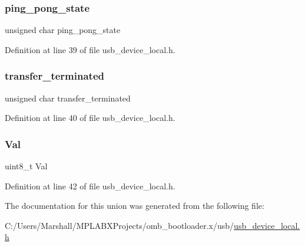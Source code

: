 \mbox{\label{union_e_p___s_t_a_t_u_s_af0b1bd7b5767b174b8f055d94cac4bcc}} 
\subsubsection{\texorpdfstring{ping\_pong\_state}{ping\_pong\_state}}
{\footnotesize\ttfamily unsigned char ping\+\_\+pong\+\_\+state}



Definition at line 39 of file usb\+\_\+device\+\_\+local.\+h.

\mbox{\label{union_e_p___s_t_a_t_u_s_a4a20792b6382277d34763fd0157c9f2e}} 
\subsubsection{\texorpdfstring{transfer\_terminated}{transfer\_terminated}}
{\footnotesize\ttfamily unsigned char transfer\+\_\+terminated}



Definition at line 40 of file usb\+\_\+device\+\_\+local.\+h.

\mbox{\label{union_e_p___s_t_a_t_u_s_aa0c179f4462bb12ca1ed40d18c89cda1}} 
\subsubsection{\texorpdfstring{Val}{Val}}
{\footnotesize\ttfamily uint8\+\_\+t Val}



Definition at line 42 of file usb\+\_\+device\+\_\+local.\+h.



The documentation for this union was generated from the following file\+:\begin{DoxyCompactItemize}
\item 
C\+:/\+Users/\+Marshall/\+M\+P\+L\+A\+B\+X\+Projects/omb\+\_\+bootloader.\+x/usb/\mbox{\hyperlink{usb__device__local_8h}{usb\+\_\+device\+\_\+local.\+h}}\end{DoxyCompactItemize}
